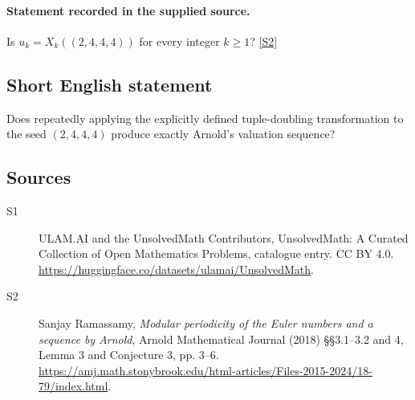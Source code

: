 \documentclass[11pt]{article}
\newcommand{\sref}[2]{\hyperlink{source:#1:#2}{[S#2]}}
\begin{document}
\paragraph{Statement recorded in the supplied source.}
Is $u_k=X_k((2,4,4,4))$ for every integer $k\ge1$? \sref{statement}{2}
\subsection{Short English statement}
Does repeatedly applying the explicitly defined tuple-doubling transformation to the seed $(2,4,4,4)$ produce exactly Arnold's valuation sequence?
\subsection{Sources}
\begin{description}
\item[\hypertarget{source:statement:1}{S1}] ULAM.AI and the UnsolvedMath Contributors, UnsolvedMath: A Curated Collection of Open Mathematics Problems, catalogue entry. CC BY 4.0. \url{https://huggingface.co/datasets/ulamai/UnsolvedMath}.
\item[\hypertarget{source:statement:2}{S2}] Sanjay Ramassamy, \emph{Modular periodicity of the Euler numbers and a sequence by Arnold}, Arnold Mathematical Journal (2018) \S\S3.1--3.2 and 4, Lemma 3 and Conjecture 3, pp. 3--6. \url{https://amj.math.stonybrook.edu/html-articles/Files-2015-2024/18-79/index.html}.
\end{description}
\label{end:statement}
\end{document}
